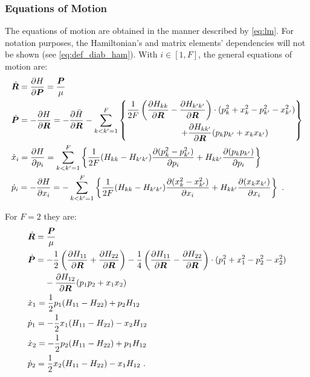 \subsubsection{Equations of Motion}
%
The equations of motion are obtained in the manner described by \cref{eq:lm}. For notation purposes, the Hamiltonian's and matrix elements' dependencies will not be shown (see \cref{eq:def_diab_ham}). With $ i \in [1, F] $, the general equations of motion are:
\begin{subequations}\label{eq:diab_motion}
\begin{align}
&\dot{\bm{R}} = \frac{\partial H}{\partial \bm{P}} = \frac{\bm{P}}{\mu}\\
&\dot{\bm{P}} = -\frac{\partial H}{\partial \bm{R}} = 
-\frac{\partial \bar{H}}{\partial \bm{R}}-\sum\limits_{k<k'=1}^{F}
\left\{\begin{aligned}
\frac{1}{2F}\left(\frac{\partial H_{kk}}{\partial \bm{R}}-\frac{\partial H_{k'k'}}{\partial \bm{R}}\right)&\cdot(p_{k}^{2}+x_{k}^{2}-p_{k'}^{2}-x_{k'}^{2})\\
+\frac{\partial H_{kk'}}{\partial \bm{R}}&(p_{k}p_{k'}+x_{k}x_{k'})
\end{aligned}\right\}\\
&\dot{x}_{i} = \frac{\partial H}{\partial p_{i}} = \sum\limits_{k<k'=1}^{F} 
\left\{\frac{1}{2F}(H_{kk}-H_{k'k'})\frac{\partial (p_{k}^{2}-p_{k'}^{2})}{\partial p_{i}}+H_{kk'}\frac{\partial (p_{k}p_{k'})}{\partial p_{i}}\right\}\\
&\dot{p}_{i} = -\frac{\partial H}{\partial x_{i}} = -\sum\limits_{k<k'=1}^{F} 
\left\{\frac{1}{2F}(H_{kk}-H_{k'k'})\frac{\partial (x_{k}^{2}-x_{k'}^{2})}{\partial x_{i}}+H_{kk'}\frac{\partial (x_{k}x_{k'})}{\partial x_{i}}\right\}~.
\end{align}
\end{subequations}

For $ F = 2 $ they are:
\begin{subequations}\label{eq:diab_motion_f=2}
\begin{align}
&\dot{\bm{R}} = \frac{\bm{P}}{\mu}\\
&\dot{\bm{P}} = 
-\frac{1}{2}\left(\frac{\partial H_{11}}{\partial \bm{R}}+\frac{\partial H_{22}}{\partial \bm{R}}\right)-\frac{1}{4}\left(\frac{\partial H_{11}}{\partial \bm{R}}-\frac{\partial H_{22}}{\partial \bm{R}}\right)\cdot(p_{1}^{2}+x_{1}^{2}-p_{2}^{2}-x_{2}^{2})\nonumber\\
&\qquad-\frac{\partial H_{12}}{\partial \bm{R}}(p_{1}p_{2}+x_{1}x_{2})\\
&\dot{x}_{1} = \frac{1}{2}p_{1}(H_{11}-H_{22})+p_{2}H_{12}\\
&\dot{p}_{1} = -\frac{1}{2}x_{1}(H_{11}-H_{22})-x_{2}H_{12}\\
&\dot{x}_{2} = -\frac{1}{2}p_{2}(H_{11}-H_{22})+p_{1}H_{12}\\
&\dot{p}_{2} = \frac{1}{2}x_{2}(H_{11}-H_{22})-x_{1}H_{12}~.
\end{align}
\end{subequations}
%
